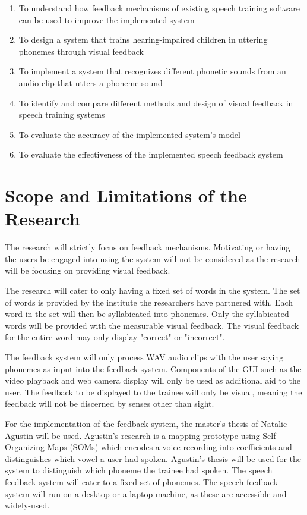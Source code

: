 \begin{enumerate}
\item To understand how feedback mechanisms of existing speech training software can be used to improve the implemented system
\item To design a system that trains hearing-impaired children in uttering phonemes through visual feedback
\item To implement a system that recognizes different phonetic sounds from an audio clip that utters a phoneme sound
\item To identify and compare different methods and design of visual feedback in speech training systems
\item To evaluate the accuracy of the implemented system's model
\item To evaluate the effectiveness of the implemented speech feedback system
\end{enumerate}

\section{Scope and Limitations of the Research}
\label{sec:scopelimitations}

The research will strictly focus on feedback mechanisms. Motivating or having the users be engaged into using the system will not be considered as the research will be focusing on providing visual feedback.

The research will cater to only having a fixed set of words in the system. The set of words is provided by the institute the researchers have partnered with. Each word in the set will then be syllabicated into phonemes. Only the syllabicated words will be provided with the measurable visual feedback. The visual feedback for the entire word may only display "correct" or "incorrect".

The feedback system will only process WAV audio clips with the user saying phonemes as input into the feedback system. Components of the GUI such as the video playback and web camera display will only be used as additional aid to the user. The feedback to be displayed to the trainee will only be visual, meaning the feedback will not be discerned by senses other than sight.

For the implementation of the feedback system, the master's thesis of Natalie Agustin \citeyear{agustin:2014:SOM} will be used. Agustin's research is a mapping prototype using Self-Organizing Maps (SOMs) which encodes a voice recording into coefficients and distinguishes which vowel a user had spoken. Agustin's thesis will be used for the system to distinguish which phoneme the trainee had spoken. The speech feedback system will cater to a fixed set of phonemes. The speech feedback system will run on a desktop or a laptop machine, as these are accessible and widely-used. 

